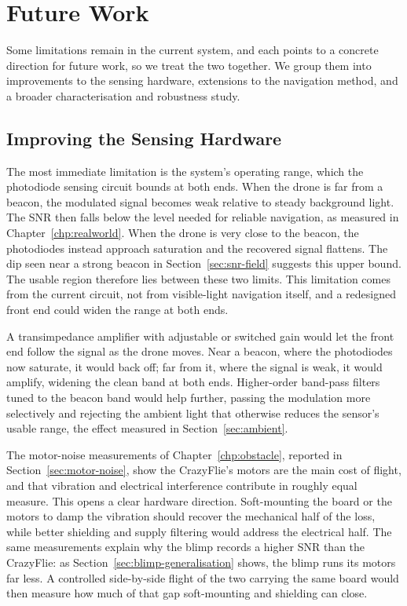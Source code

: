 \section{Future Work}
\label{sec:futurework}

Some limitations remain in the current system, and each points to a concrete direction for future work, so we treat the two together. We group them into improvements to the sensing hardware, extensions to the navigation method, and a broader characterisation and robustness study.

\subsection{Improving the Sensing Hardware}
\label{sec:fw-hardware}

The most immediate limitation is the system's operating range, which the photodiode sensing circuit bounds at both ends. When the drone is far from a beacon, the modulated signal becomes weak relative to steady background light. The SNR then falls below the level needed for reliable navigation, as measured in Chapter~\ref{chp:realworld}. When the drone is very close to the beacon, the photodiodes instead approach saturation and the recovered signal flattens. The dip seen near a strong beacon in Section~\ref{sec:snr-field} suggests this upper bound. The usable region therefore lies between these two limits. This limitation comes from the current circuit, not from visible-light navigation itself, and a redesigned front end could widen the range at both ends.

A transimpedance amplifier with adjustable or switched gain would let the front end follow the signal as the drone moves. Near a beacon, where the photodiodes now saturate, it would back off; far from it, where the signal is weak, it would amplify, widening the clean band at both ends. Higher-order band-pass filters tuned to the beacon band would help further, passing the modulation more selectively and rejecting the ambient light that otherwise reduces the sensor's usable range, the effect measured in Section~\ref{sec:ambient}.

The motor-noise measurements of Chapter~\ref{chp:obstacle}, reported in Section~\ref{sec:motor-noise}, show the CrazyFlie's motors are the main cost of flight, and that vibration and electrical interference contribute in roughly equal measure. This opens a clear hardware direction. Soft-mounting the board or the motors to damp the vibration should recover the mechanical half of the loss, while better shielding and supply filtering would address the electrical half. The same measurements explain why the blimp records a higher SNR than the CrazyFlie: as Section~\ref{sec:blimp-generalisation} shows, the blimp runs its motors far less. A controlled side-by-side flight of the two carrying the same board would then measure how much of that gap soft-mounting and shielding can close.

